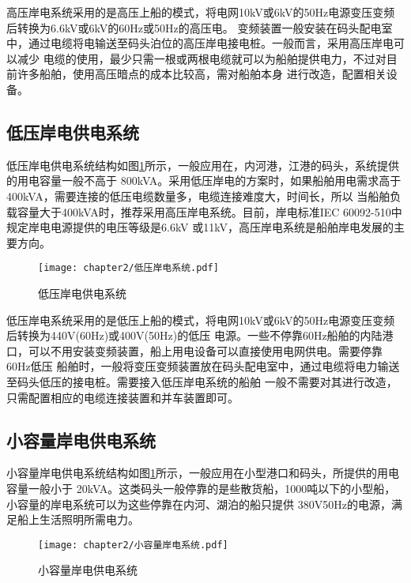 高压岸电系统采用的是高压上船的模式，将电网10kV或6kV的50Hz电源变压变频后转换为6.6kV或6kV的60Hz或50Hz的高压电。
变频装置一般安装在码头配电室中，通过电缆将电输送至码头泊位的高压岸电接电桩。一般而言，采用高压岸电可以减少
电缆的使用，最少只需一根或两根电缆就可以为船舶提供电力，不过对目前许多船舶，使用高压暗点的成本比较高，需对船舶本身
进行改造，配置相关设备。

\subsection{低压岸电供电系统}

低压岸电供电系统结构如图\ref{fig:低压岸电供电系统}所示，一般应用在，内河港，江港的码头，系统提供的用电容量一般不高于
800kVA。采用低压岸电的方案时，如果船舶用电需求高于400kVA，需要连接的低压电缆数量多，电缆连接难度大，时间长，所以
当船舶负载容量大于400kVA时，推荐采用高压岸电系统。目前，岸电标准IEC 60092-510中规定岸电电源提供的电压等级是6.6kV
或11kV，高压岸电系统是船舶岸电发展的主要方向。 

\begin{figure}[!htp]
	\centering
	\texttt{[image: chapter2/低压岸电系统.pdf]}
	\caption{低压岸电供电系统}
	\label{fig:低压岸电供电系统}
\end{figure}

低压岸电系统采用的是低压上船的模式，将电网10kV或6kV的50Hz电源变压变频后转换为440V(60Hz)或400V(50Hz)的低压
电源。一些不停靠60Hz船舶的内陆港口，可以不用安装变频装置，船上用电设备可以直接使用电网供电。需要停靠60Hz低压
船舶时，一般将变压变频装置放在码头配电室中，通过电缆将电力输送至码头低压的接电桩。需要接入低压岸电系统的船舶
一般不需要对其进行改造，只需配置相应的电缆连接装置和并车装置即可。

\subsection{小容量岸电供电系统}

小容量岸电供电系统结构如图\ref{fig:低压岸电供电系统}所示，一般应用在小型港口和码头，所提供的用电容量一般小于
20kVA。这类码头一般停靠的是些散货船，1000吨以下的小型船，小容量的岸电系统可以为这些停靠在内河、湖泊的船只提供
380V50Hz的电源，满足船上生活照明所需电力。

\begin{figure}[!htp]
	\centering
	\texttt{[image: chapter2/小容量岸电系统.pdf]}
	\caption{小容量岸电供电系统}
	\label{fig:小容量岸电供电系统}
\end{figure}

